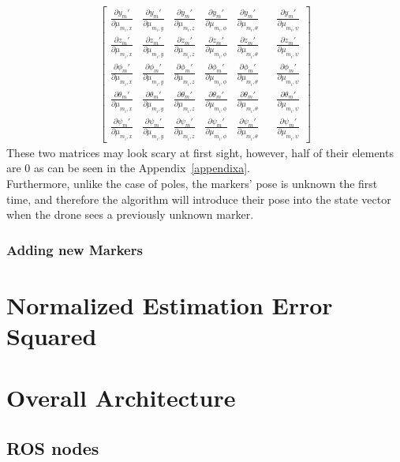 \begin{align}
\begin{bmatrix}
        \frac{\partial y_m'}{\partial \mu_{m_i, x}} & \frac{\partial y_m'}{\partial \mu_{m_i, y}} & \frac{\partial y_m'}{\partial \mu_{m_i, z}} & \frac{\partial y_m'}{\partial \mu_{m_i, \phi}} & \frac{\partial y_m'}{\partial \mu_{m_i, \theta}} & & \frac{\partial y_m'}{\partial \mu_{m_i, \psi}}\\
        \frac{\partial z_m'}{\partial \mu_{m_i, x}} & \frac{\partial z_m'}{\partial \mu_{m_i, y}} & \frac{\partial z_m'}{\partial \mu_{m_i, z}} & \frac{\partial z_m'}{\partial \mu_{m_i, \phi}} & \frac{\partial z_m'}{\partial \mu_{m_i, \theta}} & & \frac{\partial z_m'}{\partial \mu_{m_i, \psi}}\\
        \frac{\partial \phi_m'}{\partial \mu_{m_i, x}} & \frac{\partial \phi_m'}{\partial \mu_{m_i, y}} & \frac{\partial \phi_m'}{\partial \mu_{m_i, z}} & \frac{\partial \phi_m'}{\partial \mu_{m_i, \phi}} & \frac{\partial \phi_m'}{\partial \mu_{m_i, \theta}} & & \frac{\partial \phi_m'}{\partial \mu_{m_i, \psi}}\\
        \frac{\partial \theta_m'}{\partial \mu_{m_i, x}} & \frac{\partial \theta_m'}{\partial \mu_{m_i, y}} & \frac{\partial \theta_m'}{\partial \mu_{m_i, z}} & \frac{\partial \theta_m'}{\partial \mu_{m_i, \phi}} & \frac{\partial \theta_m'}{\partial \mu_{m_i, \theta}} & & \frac{\partial \theta_m'}{\partial \mu_{m_i, \psi}}\\
        \frac{\partial \psi_m'}{\partial \mu_{m_i, x}} & \frac{\partial \psi_m'}{\partial \mu_{m_i, y}} & \frac{\partial \psi_m'}{\partial \mu_{m_i, z}} & \frac{\partial \psi_m'}{\partial \mu_{m_i, \phi}} & \frac{\partial \psi_m'}{\partial \mu_{m_i, \theta}} & & \frac{\partial \psi_m'}{\partial \mu_{m_i, \psi}}
    \end{bmatrix}
    \label{eq:chater2:correction:markers:jacobian_wrt_marker}
\end{align}
These two matrices may look scary at first sight, however, half of their elements are 0 as can be seen in the Appendix~\ref{appendixa}.\\

Furthermore, unlike the case of poles, the markers' pose is unknown the first time, and therefore the algorithm will introduce their pose into the state vector when the drone sees a previously unknown marker.
\subsubsection{Adding new Markers}
\label{subsubsec:chapter2:correction:markers:add}

\section{Normalized Estimation Error Squared}
\label{sec:chapter2:nees}

\section{Overall Architecture}
\label{sec:chapter2:arch}
\subsection{ROS nodes}
\label{subsec:chapter2:arch:nodes}

